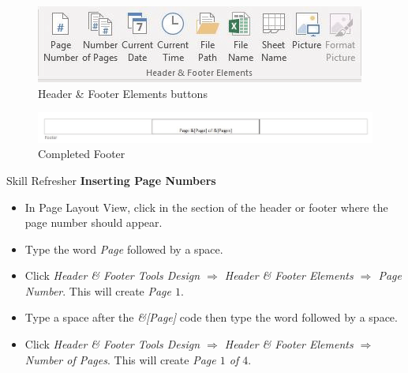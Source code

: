 \begin{figure}[H]
	\centering
	\includegraphics[width=\maxwidth{.95\linewidth}]{gfx/ch03_fig32}
	\caption{Header \& Footer Elements buttons}
	\label{03:fig32}
\end{figure}

\begin{figure}[H]
	\centering
	\includegraphics[width=\maxwidth{.95\linewidth}]{gfx/ch03_fig33}
	\caption{Completed Footer}
	\label{03:fig33}
\end{figure}

\begin{center}
	\begin{sklbox}{Skill Refresher}
		\textbf{Inserting Page Numbers}
		\\
		\begin{itemize}
			\setlength{\itemsep}{0pt}
			\setlength{\parskip}{0pt}
			\setlength{\parsep}{0pt}

			\item In Page Layout View, click in the section of the header or footer where the page number should appear.
			\item Type the word \textit{Page} followed by a space.
			\item Click \textit{Header \& Footer Tools Design $ \Rightarrow $ Header \& Footer Elements $ \Rightarrow $ Page Number}. This will create \textit{Page $ 1 $}.
			\item Type a space after the \textit{\&[Page]} code then type the word  followed by a space. 
			\item Click \textit{Header \& Footer Tools Design $ \Rightarrow $ Header \& Footer Elements $ \Rightarrow $ Number of Pages}. This will create \textit{Page $ 1 $ of $ 4 $}.
			
		\end{itemize}
	\end{sklbox}
\end{center}

